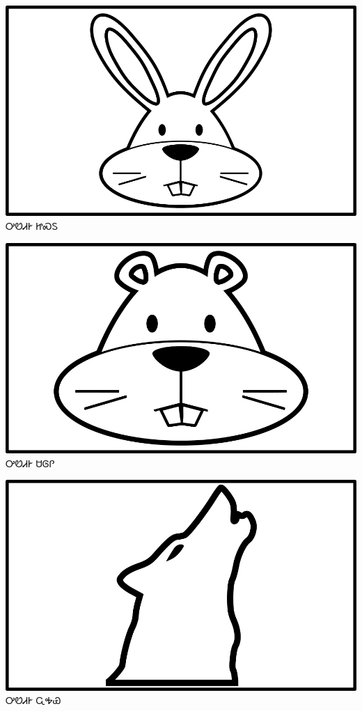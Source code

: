 \documentclass[avery5371]{flashcards}%
\begin{document}
    \begin{flashcard}{
        \includegraphics[width=0.95\columnwidth,height=.51\columnwidth,keepaspectratio]{../artwork/objects-animate/jisdu}
    }
        \Huge ᎤᏬᏗᎨ ᏥᏍᏚ
    \end{flashcard}

    \begin{flashcard}{
        \includegraphics[width=0.95\columnwidth,height=.51\columnwidth,keepaspectratio]{../artwork/objects-animate/saloli}
    }
        \Huge ᎤᏬᏗᎨ ᏌᎶᎵ
    \end{flashcard}

    \begin{flashcard}{
        \includegraphics[width=0.95\columnwidth,height=.51\columnwidth,keepaspectratio]{../artwork/objects-animate/wahya}
    }
        \Huge ᎤᏬᏗᎨ ᏩᎭᏯ
    \end{flashcard}
\end{document}
